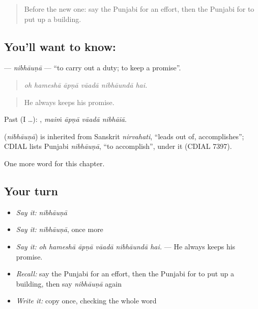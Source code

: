 \label{lesson:PA-C363-nibhauna}



\begin{quote}
Before the new one: say the Punjabi for an effort, then the Punjabi for to put up a building.
\end{quote}

\subsection*{You'll want to know: }
\textbf{} — \emph{nibhāuṇā} — \textquotedblleft{}to carry out a duty; to keep a promise\textquotedblright{}.

\begin{quote}
     
\end{quote}

\begin{quote}
\emph{oh hameshā āpṇā vāadā nibhāundā hai.}
\end{quote}

\begin{quote}
He always keeps his promise.
\end{quote}

Past (I …):    , \emph{maiṁ āpṇā vāadā nibhāiā}.

\begin{cousinweb}
\textbf{} (\emph{nibhāuṇā}) is inherited from Sanskrit \emph{nirvahati}, \textquotedblleft{}leads out of, accomplishes\textquotedblright{}; CDIAL lists Punjabi \emph{nibhāuṇā}, \textquotedblleft{}to accomplish\textquotedblright{}, under it (CDIAL 7397).
\end{cousinweb}

\begin{grammarlens}[title={What you've built}]
One more word for this chapter.
\end{grammarlens}

\subsection*{Your turn}
\begin{itemize}
\raggedright
  \item \emph{Say it:} \emph{nibhāuṇā}
  \item \emph{Say it:} \emph{nibhāuṇā}, once more
  \item \emph{Say it:} \emph{oh hameshā āpṇā vāadā nibhāundā hai.} — He always keeps his promise.
  \item \emph{Recall:} say the Punjabi for an effort, then the Punjabi for to put up a building, then say \emph{nibhāuṇā} again
  \item \emph{Write it:} copy \textbf{} once, checking the whole word
\end{itemize}

